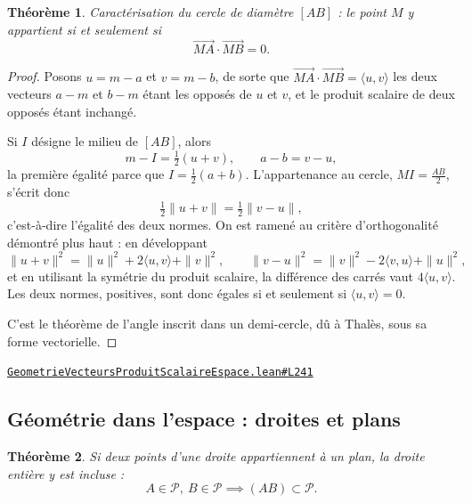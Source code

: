 \documentclass[11pt,a4paper]{article}
\theoremstyle{definition}
\theoremstyle{plain}
\newtheorem{theoreme}{Théorème}
\newcommand{\source}[2]{\par\smallskip\noindent\hfill{\footnotesize\href{#1}{\texttt{#2}}}\par\smallskip}
\begin{document}
\begin{theoreme}
Caractérisation du cercle de diamètre $[AB]$ : le point $M$ y appartient si et seulement si
\[ \overrightarrow{MA} \cdot \overrightarrow{MB} = 0 . \]
\end{theoreme}

\begin{proof}
Posons $u = m - a$ et $v = m - b$, de sorte que
$\overrightarrow{MA}\cdot\overrightarrow{MB} = \langle u, v\rangle$ \textemdash{} les deux
vecteurs $a - m$ et $b - m$ étant les opposés de $u$ et $v$, et le produit scalaire de deux
opposés étant inchangé.

Si $I$ désigne le milieu de $[AB]$, alors
\[ m - I = \tfrac{1}{2}(u + v) , \qquad a - b = v - u , \]
la première égalité parce que $I = \frac{1}{2}(a+b)$. L'appartenance au cercle,
$MI = \frac{AB}{2}$, s'écrit donc
\[ \tfrac{1}{2}\|u + v\| = \tfrac{1}{2}\|v - u\| , \]
c'est-à-dire l'égalité des deux normes. On est ramené au critère d'orthogonalité démontré
plus haut : en développant
\[ \|u+v\|^{2} = \|u\|^{2} + 2\langle u, v\rangle + \|v\|^{2} , \qquad
   \|v-u\|^{2} = \|v\|^{2} - 2\langle v, u\rangle + \|u\|^{2} , \]
et en utilisant la symétrie du produit scalaire, la différence des carrés vaut
$4\langle u, v\rangle$. Les deux normes, positives, sont donc égales si et seulement si
$\langle u, v\rangle = 0$.

\medskip\noindent
C'est le théorème de l'angle inscrit dans un demi-cercle, dû à Thalès, sous sa forme
vectorielle.
\end{proof}
\source{https://github.com/Commutator-IO/learn-lean/blob/main/courses/02-lycee/08-geometrie-vecteurs-produit-scalaire-espace/GeometrieVecteursProduitScalaireEspace.lean\#L241}{GeometrieVecteursProduitScalaireEspace.lean\#L241}

\subsection{Géométrie dans l'espace : droites et plans}

\begin{theoreme}
Si deux points d'une droite appartiennent à un plan, la droite entière y est incluse :
\[ A \in \mathcal{P},\ B \in \mathcal{P} \implies (AB) \subset \mathcal{P} . \]
\end{theoreme}
\end{document}
